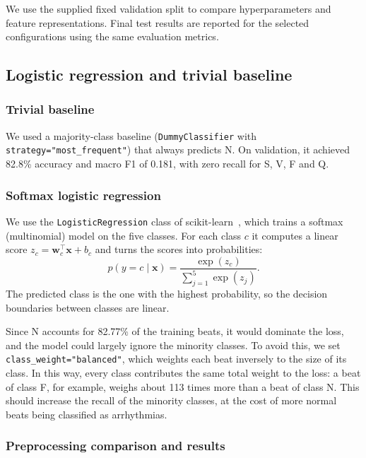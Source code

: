 \documentclass[11pt,oneside,a4paper]{article}
\begin{document}
    We use the supplied fixed validation split to compare
    hyperparameters and feature representations. Final test results
    are reported for the selected configurations using the same
    evaluation metrics.
    \subsection{Logistic regression and trivial baseline}\label{chapter : logreg}

    \subsubsection{Trivial baseline}

    We used a majority-class baseline
    (\texttt{DummyClassifier} with
    \texttt{strategy="most\_frequent"}) that always predicts N.
    On validation, it achieved 82.8\% accuracy and macro F1 of
    0.181, with zero recall for S, V, F and Q.

    \subsubsection{Softmax logistic regression}

    We use the \texttt{LogisticRegression} class of scikit-learn~\cite{sklearn_docs},
    which trains a softmax (multinomial) model on the five classes.
    For each class $c$ it computes a linear score
    $z_c = \mathbf{w}_c^{\top}\mathbf{x} + b_c$ and turns the
    scores into probabilities:
    \begin{equation}
        p(y = c \mid \mathbf{x}) =
        \frac{\exp(z_c)}{\sum_{j=1}^{5} \exp(z_j)} .
    \end{equation}
    The predicted class is the one with the highest probability,
    so the decision boundaries between classes are linear.

    Since N accounts for 82.77\% of the training beats, it would
    dominate the loss, and the model could largely ignore the
    minority classes. To avoid this, we set
    \texttt{class\_weight="balanced"}, which weights each
    beat inversely to the size of its class. In this way, every
    class contributes the same total weight to the loss: a beat
    of class F, for example, weighs about 113 times more than a
    beat of class N. This should increase the recall of the
    minority classes, at the cost of more normal beats being
    classified as arrhythmias.

    \subsubsection{Preprocessing comparison and results}
\end{document}
